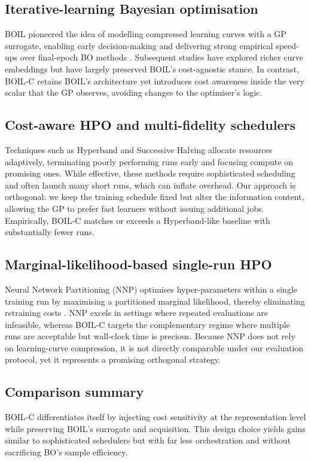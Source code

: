 \documentclass{article} %
\begin{document}
\subsection{Iterative-learning Bayesian optimisation}
BOIL pioneered the idea of modelling compressed learning curves with a GP surrogate, enabling early decision-making and delivering strong empirical speed-ups over final-epoch BO methods \cite{nguyen-2019-bayesian}. Subsequent studies have explored richer curve embeddings but have largely preserved BOIL’s cost-agnostic stance. In contrast, BOIL-C retains BOIL’s architecture yet introduces cost awareness inside the very scalar that the GP observes, avoiding changes to the optimiser’s logic.

\subsection{Cost-aware HPO and multi-fidelity schedulers}
Techniques such as Hyperband and Successive Halving allocate resources adaptively, terminating poorly performing runs early and focusing compute on promising ones. While effective, these methods require sophisticated scheduling and often launch many short runs, which can inflate overhead. Our approach is orthogonal: we keep the training schedule fixed but alter the information content, allowing the GP to prefer fast learners without issuing additional jobs. Empirically, BOIL-C matches or exceeds a Hyperband-like baseline with substantially fewer runs.

\subsection{Marginal-likelihood-based single-run HPO}
Neural Network Partitioning (NNP) optimises hyper-parameters within a single training run by maximising a partitioned marginal likelihood, thereby eliminating retraining costs \cite{mlodozeniec-2023-hyperparameter}. NNP excels in settings where repeated evaluations are infeasible, whereas BOIL-C targets the complementary regime where multiple runs are acceptable but wall-clock time is precious. Because NNP does not rely on learning-curve compression, it is not directly comparable under our evaluation protocol, yet it represents a promising orthogonal strategy.

\subsection{Comparison summary}
BOIL-C differentiates itself by injecting cost sensitivity at the representation level while preserving BOIL’s surrogate and acquisition. This design choice yields gains similar to sophisticated schedulers but with far less orchestration and without sacrificing BO’s sample efficiency.
\end{document}
